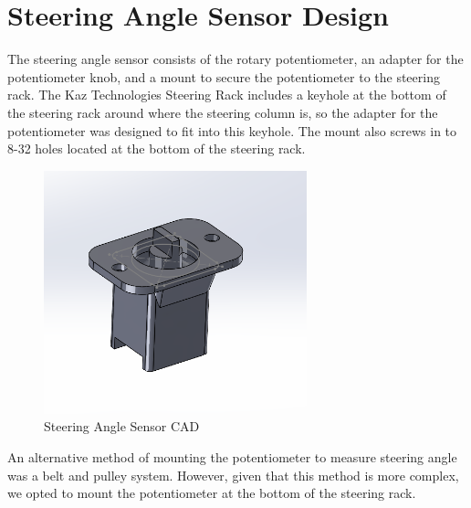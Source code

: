 \section{Steering Angle Sensor Design}
The steering angle sensor consists of the rotary potentiometer, an adapter for the potentiometer knob, and a mount to secure the potentiometer to the steering rack.
The Kaz Technologies Steering Rack includes a keyhole at the bottom of the steering rack around where the steering column is, so the adapter for the potentiometer was designed to fit into this keyhole.
The mount also screws in to 8-32 holes located at the bottom of the steering rack.
\begin{figure}[H]
    \centering
    \includegraphics[width=3in]{images/steering.png}
    \caption{Steering Angle Sensor CAD}
    \label{fig:sasc}
\end{figure}

An alternative method of mounting the potentiometer to measure steering angle was a belt and pulley system.
However, given that this method is more complex, we opted to mount the potentiometer at the bottom of the steering rack.

